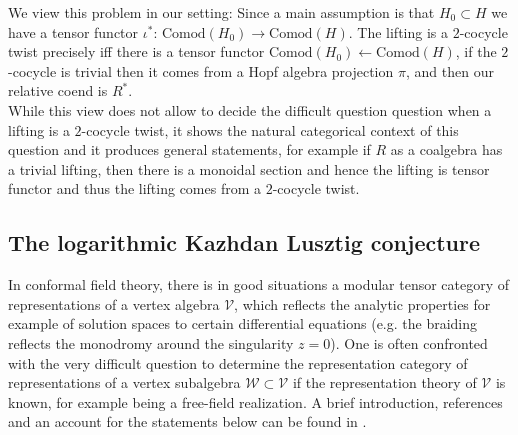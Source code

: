\documentclass[11pt]{amsart}
\renewcommand{\_}[1]{\mbox{$_{\left( #1 \right)}$}}
\theoremstyle{plain}
\numberwithin{equation}{section}
\theoremstyle{definition}
\theoremstyle{remark}
\theoremstyle{introTheorems}
\begin{document}
We view this problem in our setting: Since a main assumption is that  $H_0\subset H$ we have a tensor functor $\iota^*:\,\mathrm{Comod}(H_0)\to \mathrm{Comod}(H)$. The lifting is a $2$-cocycle twist precisely iff there is a tensor functor $\mathrm{Comod}(H_0)\leftarrow \mathrm{Comod}(H)$, if the $2$-cocycle is trivial then it comes from a Hopf algebra projection $\pi$, and then our relative coend is $R^*$. \\

While this view does not allow to decide the difficult question question when a lifting is a $2$-cocycle twist, it shows the natural categorical context of this question and it produces general statements, for example if $R$ as a coalgebra has a trivial lifting, then there is a monoidal section and hence the lifting is  tensor functor and thus the lifting comes from a $2$-cocycle twist. 

\subsection{The logarithmic Kazhdan Lusztig conjecture }

In conformal field theory, there is in good situations a modular tensor category of  representations of a vertex algebra $\mathcal{V}$, which reflects the analytic properties for example of solution spaces to certain differential equations (e.g. the braiding reflects the monodromy around the singularity $z=0$). One is often confronted with the very difficult question to determine the representation category of representations of a vertex subalgebra  $\mathcal{W}\subset \mathcal{V}$ if the representation theory of $\mathcal{V}$ is known, for example being a free-field realization. A brief introduction, references and an account for the statements below can be found in \cite{CLR}. \\
\end{document}
